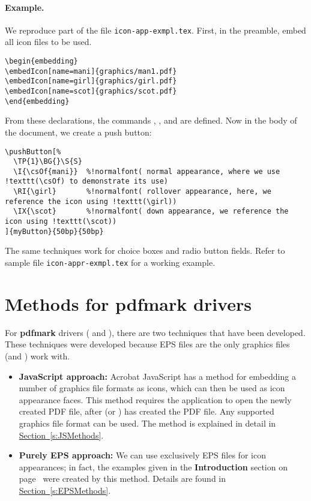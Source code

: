\documentclass{article}
\def\psf#1{\textsf{\textbf{#1}}}
\def\mpFmt{\raggedleft\itshape\small}
\begin{document}
\paragraph*{Example.} We reproduce part of the file \texttt{icon-app-exmpl.tex}. First, in the preamble,
embed all icon files to be used.
\begin{Verbatim}[xleftmargin=\parindent,fontsize=\small]
\begin{embedding}
\embedIcon[name=mani]{graphics/man1.pdf}
\embedIcon[name=girl]{graphics/girl.pdf}
\embedIcon[name=scot]{graphics/scot.pdf}
\end{embedding}
\end{Verbatim}
From these declarations, the commands , , and  are
defined. Now in the body of the document, we create a push button:
\begin{Verbatim}[xleftmargin=\parindent,commandchars=!(),fontsize=\small]
\pushButton[%
  \TP{1}\BG{}\S{S}
  \I{\csOf{mani}}  %!normalfont( normal appearance, where we use !texttt(\csOf) to demonstrate its use)
  \RI{\girl}       %!normalfont( rollover appearance, here, we reference the icon using !texttt(\girl))
  \IX{\scot}       %!normalfont( down appearance, we reference the icon using !texttt(\scot))
]{myButton}{50bp}{50bp}
\end{Verbatim}
The same techniques work for choice boxes and radio button fields. Refer to sample file \texttt{icon-appr-exmpl.tex}
for a working example.

\section{Methods for \textsf{pdfmark} drivers}

For \psf{pdfmark} drivers ( and )\marginpar{\mpFmt\sffamily dvips\\ dvipsone}, there
are two techniques that have been developed. These techniques were developed because
EPS files are the only graphics files  (and ) work with.
\begin{itemize}
   \item \textbf{JavaScript approach:} Acrobat JavaScript has a method for
       embedding a number of graphics file formats as icons, which can then
       be used as icon appearance faces. This method requires the
        application to open the newly created PDF file, after
        (or ) has created the PDF file. Any
       supported graphics file format can be used. The method is explained
       in detail in \hyperref[s:JSMethods]{Section~\ref*{s:JSMethods}}.

   \item \textbf{Purely EPS approach:} We can use exclusively EPS files for
       icon appearances; in fact, the examples given in the
       \textbf{Introduction} section on page~\pageref{intro} were created by this
       method. Details are found in \hyperref[s:EPSMethods]{Section~\ref*{s:EPSMethods}}.
\end{itemize}
\end{document}
